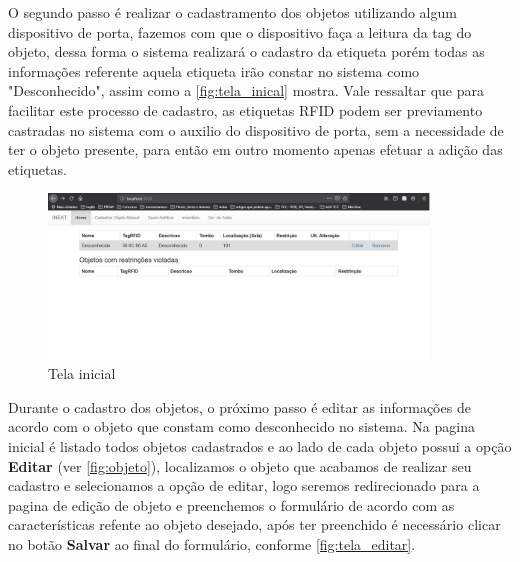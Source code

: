 \par
O segundo passo é realizar o cadastramento dos objetos utilizando algum dispositivo de porta, fazemos com que o dispositivo faça a leitura da tag do objeto, dessa forma o sistema realizará o cadastro da etiqueta porém todas as informações referente aquela etiqueta irão constar no sistema como "Desconhecido", assim como a \autoref{fig:tela_inical} mostra. Vale ressaltar que para facilitar este processo de cadastro, as etiquetas RFID podem ser previamento castradas no sistema com o auxilio do dispositivo de porta, sem a necessidade de ter o objeto presente, para então em outro momento apenas efetuar a adição das etiquetas.

\begin{figure}[H]
              \caption{\label{fig:tela_inical}Tela inicial}
              \centering
              \includegraphics[width=0.9\textwidth]{Figuras/tela_inical.PNG}
\end{figure}


\par
Durante o cadastro dos objetos, o próximo passo é editar as informações de acordo com o objeto que constam como desconhecido no sistema. Na pagina inicial é listado todos objetos cadastrados e ao lado de cada objeto possui a opção \textbf{Editar} (ver \autoref{fig:objeto}), localizamos o objeto que acabamos de realizar seu cadastro e selecionamos a opção de editar, logo seremos redirecionado para a pagina de edição de objeto e preenchemos o formulário de acordo com as características refente ao objeto desejado, após ter preenchido é necessário clicar no botão \textbf{Salvar} ao final do formulário, conforme \autoref{fig:tela_editar}.  

